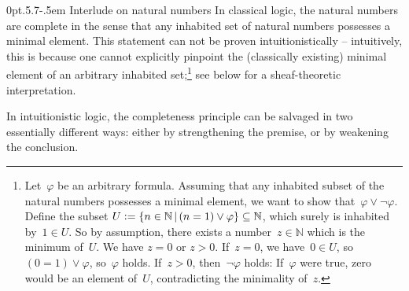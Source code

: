 \documentclass[10pt,reqno,a4paper]{amsbook}
\makeatletter
\theoremstyle{definition}
\theoremstyle{plain}
\theoremstyle{remark}
\newcommand{\NN}{\mathbb{N}}
\newcommand{\?}{\,{:}\,}
\renewcommand{\_}{\mathpunct{.}\,}
\newcommand{\defeq}{\vcentcolon=}
\def\subsection{\@startsection{subsection}{2}%
  {0pt}{.5\linespacing\@plus.7\linespacing}{-.5em}%
  {\normalfont\bfseries}}
\makeatother
\begin{document}
\subsection{Interlude on natural numbers}
In classical logic, the natural numbers are complete in the sense that any
inhabited set of natural numbers possesses a minimal element. This statement
can not be proven intuitionistically -- intuitively, this is because one cannot
explicitly pinpoint the (classically existing) minimal element of an arbitrary
inhabited set;\footnote{Let~$\varphi$ be an arbitrary formula. Assuming that
any inhabited subset of the natural numbers possesses a minimal element, we
want to show that~$\varphi \vee \neg\varphi$. Define the subset $U \defeq \{ n \in
\NN \,|\, (n = 1) \vee \varphi \} \subseteq \NN$, which surely is inhabited by~$1
\in U$. So by assumption, there exists a number~$z \in \NN$ which is the
minimum of~$U$. We have $z = 0$ or $z > 0$. If~$z = 0$, we have~$0 \in U$,
so~$(0 = 1) \vee \varphi$, so~$\varphi$ holds.  If~$z > 0$, then~$\neg\varphi$
holds: If~$\varphi$ were true, zero would be an element of~$U$, contradicting
the minimality of~$z$.} see below for a sheaf-theoretic interpretation.

In intuitionistic logic, the completeness principle can be salvaged in two
essentially different ways: either by strengthening the premise, or by
weakening the conclusion.
\end{document}
